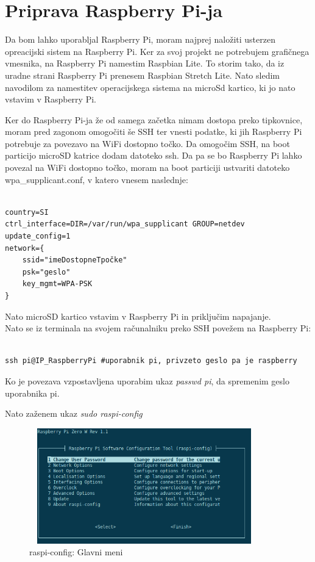 \documentclass[11pt]{article}
\begin{document}
\section{Priprava Raspberry Pi-ja}
 Da bom lahko uporabljal Raspberry Pi, moram najprej naložiti usterzen opreacijski sistem na Raspberry Pi. Ker za svoj projekt ne potrebujem grafičnega vmesnika, na Raspberry Pi namestim Raspbian Lite. To storim tako, da iz uradne strani Raspberry Pi\cite{RPi_raspbian} prenesem Raspbian Stretch Lite. Nato sledim navodilom za namestitev\cite{RPi_install} operacijskega sistema na microSd kartico, ki jo nato vstavim v Raspberry Pi.

Ker do Raspberry Pi-ja že od samega začetka nimam dostopa preko tipkovnice, moram pred zagonom omogočiti še SSH ter vnesti podatke, ki jih Raspberry Pi potrebuje za povezavo na WiFi dostopno točko. Da omogočim SSH, na boot particijo microSD katrice dodam datoteko ssh. Da pa se bo Raspberry Pi lahko povezal na WiFi dostopno točko, moram na boot particiji ustvariti datoteko wpa\_supplicant.conf, v katero vnesem naslednje:

\begin{verbatim}

country=SI
ctrl_interface=DIR=/var/run/wpa_supplicant GROUP=netdev
update_config=1
network={
	ssid="imeDostopneTpočke"
	psk="geslo"
	key_mgmt=WPA-PSK
}
\end{verbatim}

Nato microSD kartico vstavim v Raspberry Pi in priključim napajanje.
\\

Nato se iz terminala na svojem računalniku preko SSH povežem na Raspberry Pi:

\begin{verbatim}

ssh pi@IP_RaspberryPi #uporabnik pi, privzeto geslo pa je raspberry
\end{verbatim}

Ko je povezava vzpostavljena uporabim ukaz \textit{passwd pi}, da spremenim geslo uporabnika pi.

Nato zaženem ukaz \textit{sudo raspi-config}
\begin{figure}[h]
\centering
\includegraphics[width=10cm, height=5cm]{images/raspi-config.png}
\caption{raspi-config: Glavni meni}
\end{figure}
\end{document}
